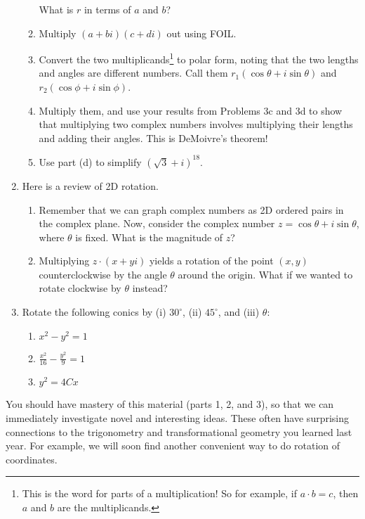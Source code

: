 \documentclass[../gatm.tex]{subfiles}
\begin{document}
\begin{enumerate}
\begin{enumerate}
What is $r$ in terms of $a$ and $b$?
\item Multiply $(a+bi)(c+di)$ out using FOIL.
\item Convert the two multiplicands\footnote{This is the word for parts of a multiplication! So for example, if $a\cdot b=c$, then $a$ and $b$ are the multiplicands.} to polar form, noting that the two lengths and angles are different numbers. Call them $r_1(\cos\theta + i\sin\theta)$ and $r_2(\cos\phi + i\sin\phi)$.
\item Multiply them, and use your results from Problems 3c and 3d to show that multiplying two complex numbers involves multiplying their lengths and adding their angles. This is DeMoivre's theorem!
\item Use part (d) to simplify $(\sqrt{3}+i)^{18}$.
\end{enumerate}
\item Here is a review of 2D rotation.
\begin{enumerate}
\item Remember that we can graph complex numbers as 2D ordered pairs in the complex plane. Now, consider the complex number $z=\cos \theta + i\sin\theta$, where $\theta$ is fixed. What is the magnitude of $z$?
\item Multiplying $z\cdot(x+yi)$ yields a rotation of the point $(x,y)$ counterclockwise by the angle $\theta$ around the origin. What if we wanted to rotate clockwise by $\theta$ instead?
\end{enumerate}
\item Rotate the following conics by (i) $30^\circ$, (ii) $45^\circ$, and (iii) $\theta$:
\begin{multicols}{3}
\begin{enumerate}
\item $x^2-y^2=1$
\item $\frac{x^2}{16}-\frac{y^2}{9}=1$
\item $y^2=4Cx$
\end{enumerate}
\end{multicols}
\end{enumerate}

\noindent You should have mastery of this material (parts 1, 2, and 3), so that we can immediately investigate novel and interesting ideas. These often have surprising connections to the trigonometry and transformational geometry you learned last year. For example, we will soon find another convenient way to do rotation of coordinates.
\end{document}
